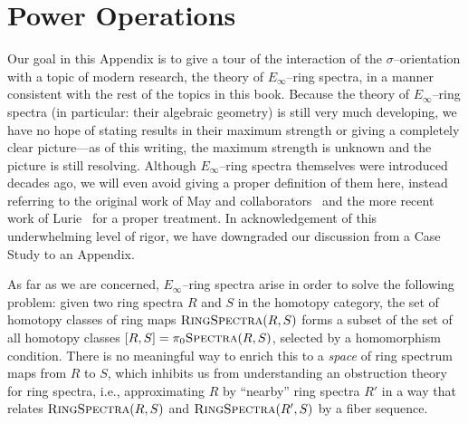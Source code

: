 


\chapter{Power Operations}\label{PowerOpnsChapter}

Our goal in this Appendix is to give a tour of the interaction of the $\sigma$--orientation with a topic of modern research, the theory of $E_\infty$--ring spectra, in a manner consistent with the rest of the topics in this book.  Because the theory of $E_\infty$--ring spectra (in particular: their algebraic geometry) is still very much developing, we have no hope of stating results in their maximum strength or giving a completely clear picture---as of this writing, the maximum strength is unknown and the picture is still resolving.  Although $E_\infty$--ring spectra themselves were introduced decades ago, we will even avoid giving a proper definition of them here, instead referring to the original work of May and collaborators~\cite{EKMM} and the more recent work of Lurie~\cite[Chapter 7]{LurieHA} for a proper treatment.  In acknowledgement of this underwhelming level of rigor, we have downgraded our discussion from a Case Study to an Appendix.

As far as we are concerned, $E_\infty$--ring spectra arise in order to solve the following problem: given two ring spectra $R$ and $S$ in the homotopy category, the set of homotopy classes of ring maps $\normalfont\textsc{RingSpectra}(R, S)$ forms a subset of the set of all homotopy classes $[R, S] = \pi_0 \normalfont\textsc{Spectra}(R, S)$, selected by a homomorphism condition.  There is no meaningful way to enrich this to a \emph{space} of ring spectrum maps from $R$ to $S$, which inhibits us from understanding an obstruction theory for ring spectra, i.e., approximating $R$ by ``nearby'' ring spectra $R'$ in a way that relates $\normalfont\textsc{RingSpectra}(R, S)$ and $\normalfont\textsc{RingSpectra}(R', S)$ by a fiber sequence.

